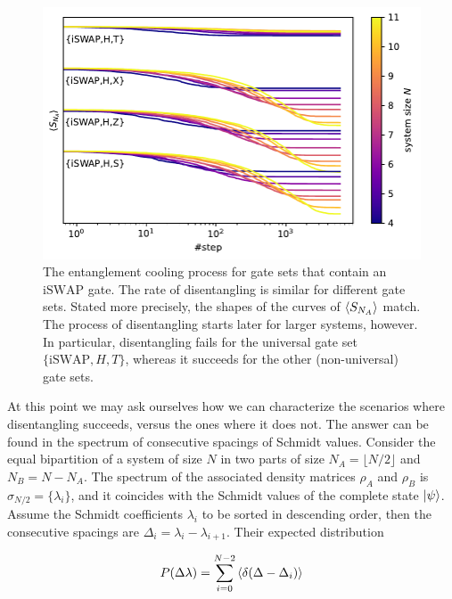 \documentclass[reprint,amsmath,amssymb,aps,prb,nofootinbib]{revtex4-2}
\begin{document}
    \begin{figure}[htb]
        \includegraphics[width=\columnwidth]{plots/therm_speed_iSWAP.pdf}
        \caption{The entanglement cooling process for gate sets that contain an $\text{iSWAP}$ gate. The rate of disentangling
        is similar for different gate sets. Stated more precisely, the shapes of the curves of $\braket{S_{N_A}}$ match. The
        process of disentangling starts later for larger systems, however. In particular, disentangling fails for the
        universal gate set $\{\text{iSWAP},H,T\}$, whereas it succeeds for the other (non-universal) gate sets.}
        \label{results:fig:therm_spped_iSWAP}
    \end{figure}

    At this point we may ask ourselves how we can characterize the scenarios where disentangling succeeds, versus the
    ones where it does not. The answer can be found in the spectrum of consecutive spacings of Schmidt values. Consider
    the equal bipartition of a system of size $N$ in two parts of size $N_A = \lfloor N/2\rfloor$ and $N_B=N-N_A$. The
    spectrum of the associated density matrices $\rho_A$ and $\rho_B$ is $\sigma_{N/2}=\{\lambda_i\}$, and it coincides
    with the Schmidt values of the complete state $\ket{\psi}$. Assume the Schmidt coefficients $\lambda_i$ to be sorted
    in descending order, then the consecutive spacings are $\Delta_i = \lambda_i-\lambda_{i+1}$. Their expected distribution

    \begin{equation}
        P(\Delta\lambda) = \sum_{i=0}^{N-2}\braket{\delta(\Delta-\Delta_i)}
        \label{results:eq:spacing_distribution}
    \end{equation}
\end{document}
